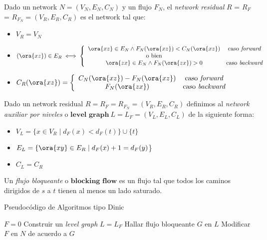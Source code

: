 \begin{definition}
Dado un network $N = (V_N, E_N, C_N)$ y un flujo $F_N$, el \emph{network residual} $R$ = $R_F$ = $R_{F_N} = (V_R, E_R, C_R)$ es el network tal que:
\begin{itemize}
    \item $V_R = V_N$
    \item $(\ora{xz}) \in E_R \iff 
    \left\{ 
    \begin{array}{cc}
    \ora{xz} \in E_N \wedge F_N(\ora{xz}) < C_N(\ora{xz})     & \text{caso \textit{forward}} \\
    \text{o bien}  & \\
    \ora{zx} \in E_N \wedge F_N(\ora{zx}) > 0 & \text{caso \textit{backward}}
    \end{array}
    \right.$
    \item $C_R(\ora{xz}) = \left\{
    \begin{array}{cc}
        C_N(\ora{xz}) -
        F_N(\ora{xz})   & \text{caso \textit{forward}}\\
        F_N(\ora{zx})   & \text{caso \textit{backward}}
    \end{array}
    \right.
    $
\end{itemize}
\end{definition}

\begin{definition}
Dado un network residual $R = R_F = R_{F_N} = (V_R, E_R, C_R)$ definimos al \emph{network auxiliar por niveles} o $\boldsymbol{level}$  $\boldsymbol{graph}\ L = L_F = (V_L, E_L, C_L)$ de la siguiente forma:
\begin{itemize}
    \item $V_L = \{ x\in V_R \mid d_F(x) < d_F(t)\} \cup \{t\}$
    \item $E_L = \{\ora{xy} \in E_R \mid d_F(x) + 1 = d_F(y)$\}
    \item $C_L = C_R$
\end{itemize}

\end{definition}

\begin{definition}
Un \emph{flujo bloqueante} o $\boldsymbol{blocking}$  $\boldsymbol{flow}$ es un flujo tal que todos los caminos dirigidos de $s$ a $t$ tienen al menos un lado saturado.
\end{definition}

\begin{algorithm}
\caption{Pseudocódigo de Algoritmos tipo Dinic}
\begin{algorithmic}
\State $F = 0$
    \State Construir un \textit{level graph} $L = L_F$
    \State Hallar flujo bloqueante $G$ en $L$
    \State Modificar $F$ en $N$ de acuerdo a $G$
\EndWhile

\end{algorithmic}
\end{algorithm}

